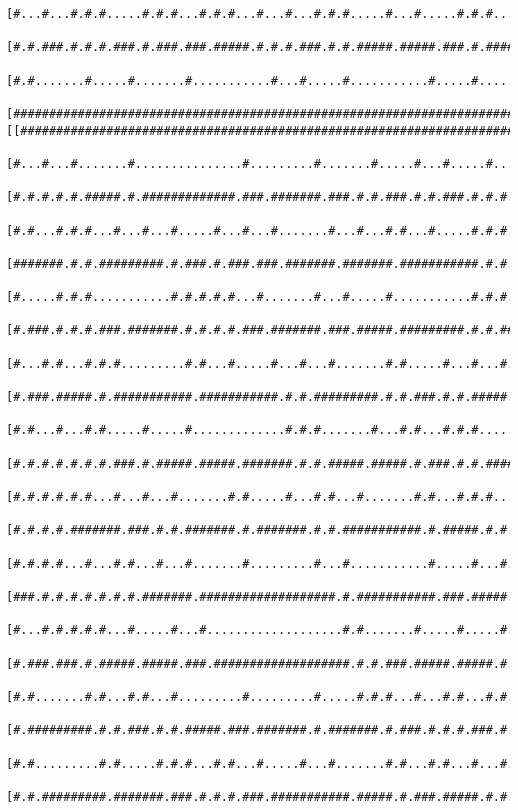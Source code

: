 \documentclass[a4paper,10pt,ngerman]{scrartcl}
\begin{document}
\begin{lstlisting}[frame=tb,basicstyle=\tiny\ttfamily]
 [#...#...#.#.#.....#.#.#...#.#.#...#...#...#.#.#.....#...#.....#.#.#...........#.#...#.#.....#...#...#]
 [#.#.###.#.#.#.###.#.###.###.#####.#.#.#.###.#.#.#####.#####.###.#.#############.#.#.#.#######.#####.#]
 [#.#.......#.....#.......#...........#...#.....#...........#.....#.................#...#.............#]
 [#####################################################################################################]]
[[#####################################################################################################]
 [#...#...#.......#...............#.........#.......#.....#...#.....#...#.....#...........#.....#.....#]
 [#.#.#.#.#.#####.#.#############.###.#######.###.#.#.###.#.#.###.#.#.#.#.###.#.#######.#.###.#.###.#.#]
 [#.#...#.#.#...#...#...#.....#...#...#.......#...#...#.#...#.....#.#.#.#.#.#.#.#.....#.#.#...#.....#.#]
 [#######.#.#.#########.#.###.#.###.###.#######.#######.###########.#.#.#.#.#.#.#####.#.#.#.#########.#]
 [#.....#.#.#...........#.#.#.#.#...#.......#...#.....#...........#.#.#...#.#.#.#...#.#.#...#...#...#.#]
 [#.###.#.#.#.###.#######.#.#.#.#.###.#######.###.#####.#########.#.#.#####.#.#.#.#.#.#.#####.#.#.#.#.#]
 [#...#.#...#.#.#.........#.#...#.....#...#...#.......#.#.....#...#...#.....#.#...#...#...#...#.#.#...#]
 [#.###.#####.#.###########.###########.#.#.#########.#.#.###.#.#.#####.#.###.###########.#.###.#.#####]
 [#.#...#...#.#.....#.....#.............#.#.#.......#...#.#...#.#.#.....#.....#.......#...#.#...#.#...#]
 [#.#.#.#.#.#.#.###.#.#####.#####.#######.#.#.#####.#####.#.###.#.#.###########.#####.#.#####.#.#.###.#]
 [#.#.#.#.#.#...#...#...#.......#.#.....#...#.#...#.......#.#...#.#.#...#.......#...#.#.#.....#.#.#...#]
 [#.#.#.#.#######.###.#.#.#######.#.#######.#.#.###########.#.#####.#.#.#.#########.#.#.#.#######.#.#.#]
 [#.#.#.#...#...#.#...#...#.......#.........#...#...........#.....#...#.#...#...#...#.#.#.........#.#.#]
 [###.#.#.#.#.#.#.#.#######.###################.#.###########.###.#####.###.#.#.#.###.#.#.#########.###]
 [#...#.#.#.#.#...#.....#...#...................#.#.......#.....#.....#.#...#.#.#.......#.#.....#.....#]
 [#.###.###.#.#####.#####.###.###################.#.#.###.#####.#####.#.#.###.#.#########.###.#.#.###.#]
 [#.#.......#.#...#.#...#.........#.........#.....#.#.#...#...#.#...#.#.#.....#.......#...#...#.#.#...#]
 [#.#########.#.#.###.#.#.#####.###.#######.#.#######.#.###.#.#.#.###.#.#####.#######.#.###.###.###.#.#]
 [#.#.........#.#.....#.#.#...#.#...#.....#...#.......#.#...#.#...#...#.#...#.....#...#.....#.#...#.#.#]
 [#.#.#########.#######.###.#.#.#.###.###########.#####.#.###.#####.#.#.#.#.#####.#.#########.###.#.#.#]

\end{lstlisting}
\end{document}
